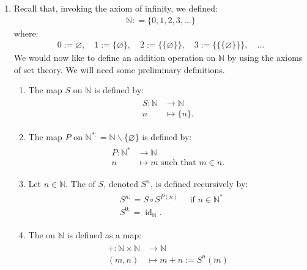 \documentclass{article}
\begin{document}
\begin{enumerate}
\item {}
Recall that, invoking the axiom of infinity, we defined:
\begin{align*}
\mathbb{N:}=\{0,1,2,3, \ldots\}
\end{align*}
where:
\begin{align*}
0:=\varnothing, \quad 1:=\{\varnothing\}, \quad 2:=\{\{\varnothing\}\}, \quad 3:=\{\{\{\varnothing\}\}\}, \quad \ldots
\end{align*}
We would now like to define an addition operation on $\mathbb{N}$ by using the axioms of set theory. We will need some preliminary definitions.
\begin{enumerate}
    \item The  map $S$ on $\mathbb{N}$ is defined by:
\begin{align*}
\begin{aligned}
S: \mathbb{N} & \rightarrow \mathbb{N} \\
n & \mapsto\{n\} .
\end{aligned}
\end{align*}
\item The  map $P$ on $\mathbb{N}^{*:}=\mathbb{N} \backslash\{\varnothing\}$ is defined by:
\begin{align*}
\begin{aligned}
P: \mathbb{N}^{*} & \rightarrow \mathbb{N} \\
n & \mapsto m \text { such that } m \in n .
\end{aligned}
\end{align*}
\item Let $n \in \mathbb{N}$. The  of $S$, denoted $S^{n}$, is defined recursively by:
\begin{align*}
\begin{aligned}
&S^{n:}=S \circ S^{P(n)} \quad \text { if } n \in \mathbb{N}^{*} \\
&S^{0:}=\operatorname{id}_{\mathbb{N}} .
\end{aligned}
\end{align*}
\item The  on $\mathbb{N}$ is defined as a map:
\begin{align*}
\begin{aligned}
+: \mathbb{N} \times \mathbb{N} & \rightarrow \mathbb{N} \\
(m, n) & \mapsto m+n:=S^{n}(m)
\end{aligned}
\end{align*}

\end{enumerate}
\end{enumerate}
\end{document}
